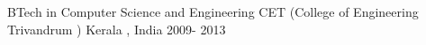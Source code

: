 \begin{cventries}
  \cventry
    {BTech in Computer Science and Engineering}
    {CET (College of Engineering Trivandrum )}
    {Kerala , India}
    {2009- 2013}
    {}
\end{cventries}
